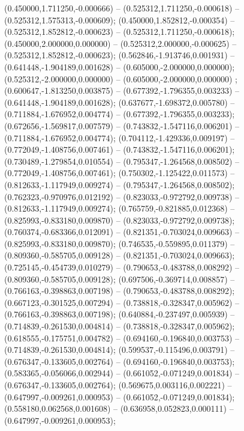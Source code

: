  (0.450000,1.711250,-0.000666) -- (0.525312,1.711250,-0.000618) -- (0.525312,1.575313,-0.000609);
 (0.450000,1.852812,-0.000354) -- (0.525312,1.852812,-0.000623) -- (0.525312,1.711250,-0.000618);
 (0.450000,2.000000,0.000000) -- (0.525312,2.000000,-0.000625) -- (0.525312,1.852812,-0.000623);
 (0.562846,-1.913746,0.001931) -- (0.641448,-1.904189,0.001628) -- (0.605000,-2.000000,0.000000);
 (0.525312,-2.000000,0.000000) -- (0.605000,-2.000000,0.000000) ;
 (0.600647,-1.813250,0.003875) -- (0.677392,-1.796355,0.003233) -- (0.641448,-1.904189,0.001628);
 (0.637677,-1.698372,0.005780) -- (0.711884,-1.676952,0.004774) -- (0.677392,-1.796355,0.003233);
 (0.672656,-1.569817,0.007579) -- (0.743832,-1.547116,0.006201) -- (0.711884,-1.676952,0.004774);
 (0.704112,-1.429336,0.009197) -- (0.772049,-1.408756,0.007461) -- (0.743832,-1.547116,0.006201);
 (0.730489,-1.279854,0.010554) -- (0.795347,-1.264568,0.008502) -- (0.772049,-1.408756,0.007461);
 (0.750302,-1.125422,0.011573) -- (0.812633,-1.117949,0.009274) -- (0.795347,-1.264568,0.008502);
 (0.762323,-0.970976,0.012192) -- (0.823033,-0.972792,0.009738) -- (0.812633,-1.117949,0.009274);
 (0.765759,-0.821885,0.012368) -- (0.825993,-0.833180,0.009870) -- (0.823033,-0.972792,0.009738);
 (0.760374,-0.683366,0.012091) -- (0.821351,-0.703024,0.009663) -- (0.825993,-0.833180,0.009870);
 (0.746535,-0.559895,0.011379) -- (0.809360,-0.585705,0.009128) -- (0.821351,-0.703024,0.009663);
 (0.725145,-0.454739,0.010279) -- (0.790653,-0.483788,0.008292) -- (0.809360,-0.585705,0.009128);
 (0.697506,-0.369714,0.008857) -- (0.766163,-0.398863,0.007198) -- (0.790653,-0.483788,0.008292);
 (0.667123,-0.301525,0.007294) -- (0.738818,-0.328347,0.005962) -- (0.766163,-0.398863,0.007198);
 (0.640884,-0.237497,0.005939) -- (0.714839,-0.261530,0.004814) -- (0.738818,-0.328347,0.005962);
 (0.618555,-0.175751,0.004782) -- (0.694160,-0.196840,0.003753) -- (0.714839,-0.261530,0.004814);
 (0.599537,-0.115496,0.003791) -- (0.676347,-0.133605,0.002764) -- (0.694160,-0.196840,0.003753);
 (0.583365,-0.056066,0.002944) -- (0.661052,-0.071249,0.001834) -- (0.676347,-0.133605,0.002764);
 (0.569675,0.003116,0.002221) -- (0.647997,-0.009261,0.000953) -- (0.661052,-0.071249,0.001834);
 (0.558180,0.062568,0.001608) -- (0.636958,0.052823,0.000111) -- (0.647997,-0.009261,0.000953);
